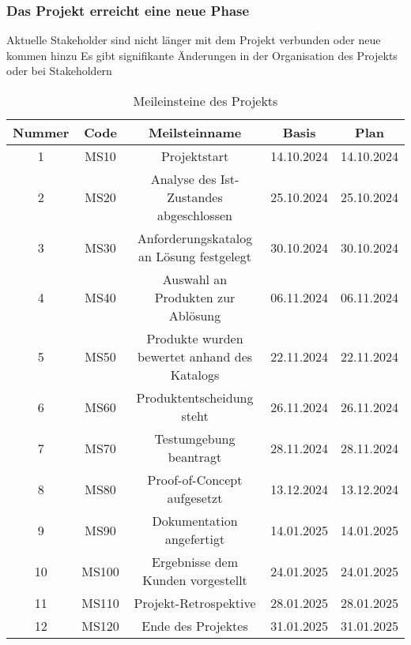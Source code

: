 \documentclass[ThesisDJ.tex]{subfiles}
\begin{document}
\subsubsection{Das Projekt erreicht eine neue Phase}
Aktuelle Stakeholder sind nicht länger mit dem Projekt verbunden oder neue kommen hinzu
Es gibt signifikante Änderungen in der Organisation des Projekts oder bei Stakeholdern


\begin{table}[h]
  \centering
\begin{tabular}{|c|c|c|c|c|}
  \hline
  Nummer & Code & Meilsteinname & Basis & Plan \\
  \hline
  1 & MS10 & Projektstart & 14.10.2024 & 14.10.2024 \\
  \hline
  2 & MS20 & Analyse des Ist-Zustandes abgeschlossen & 25.10.2024 & 25.10.2024 \\
  \hline
  3 & MS30 & Anforderungskatalog an Lösung festgelegt & 30.10.2024 & 30.10.2024 \\
  \hline
  4 & MS40 & Auswahl an Produkten zur Ablösung & 06.11.2024 & 06.11.2024 \\
  \hline
  5 & MS50 & Produkte wurden bewertet anhand des Katalogs & 22.11.2024 & 22.11.2024 \\
  \hline
  6 & MS60 & Produktentscheidung steht & 26.11.2024 & 26.11.2024 \\
  \hline
  7 & MS70 & Testumgebung beantragt & 28.11.2024 & 28.11.2024 \\
  \hline
  8 & MS80 & Proof-of-Concept aufgesetzt & 13.12.2024 & 13.12.2024 \\
  \hline
  9 & MS90 & Dokumentation angefertigt & 14.01.2025 & 14.01.2025 \\
  \hline
  10 & MS100 & Ergebnisse dem Kunden vorgestellt & 24.01.2025 & 24.01.2025 \\
  \hline
  11 & MS110 & Projekt-Retrospektive & 28.01.2025 & 28.01.2025 \\
  \hline
  12 & MS120 & Ende des Projektes & 31.01.2025 & 31.01.2025 \\
  \hline
\end{tabular}

\caption{Meileinsteine des Projekts}
\label{tab:milestones}

\end{table}
\end{document}
